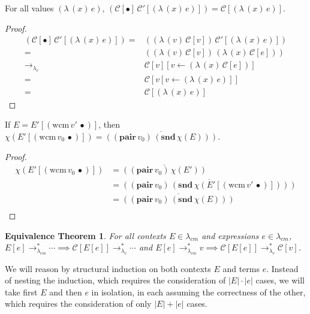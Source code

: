 \documentclass[ms,electronic,twosidetoc,letterpaper,chaptercenter,parttop]{byumsphd}
\newcommand{\pair}[2]{((\mathbf{pair}\,#1)\,#2)}
\newcommand{\eval}[1]{\overline{#1}}
\newcommand{\lvrr}{\rightarrow_{\lambda_v}}
\newcommand{\lvrrs}{\rightarrow_{\lambda_v}^{*}}
\newcommand{\cmrrs}{\rightarrow_{\lambda_{cm}}^{*}}
\newcommand{\C}[1]{\mathcal{C}[#1]}
\newcommand{\Cp}[1]{\mathcal{C}'[#1]}
\newcommand{\abs}[2]{(\lambda\,(#1)\,#2)}
\newcommand{\app}[2]{(#1\,#2)}
\newcommand{\wcm}[2]{(\mathrm{wcm}\,#1\,#2)}
\newcommand{\hole}{\bullet}
\begin{document}
\begin{lemma}
\label{hole-context-to-value}
For all values $\abs{x}{e}$, $\app{\C{\hole}}{\Cp{\abs{x}{e}}}=\C{\abs{x}{e}}$.
\end{lemma}

\begin{proof}
\begin{align*}
\app{\C{\hole}}{\Cp{\abs{x}{e}}} = &\app{\abs{v}{\C{v}}}{\Cp{\abs{x}{e}}}\\
                                 = &\app{\abs{v}{\C{v}}}{\abs{x}{\C{e}}}\\
                             \lvrr &\C{v}[v\leftarrow \abs{x}{\C{e}}]\\
                                 = &\C{v[v\leftarrow \abs{x}{e}]}\\
                                 = &\C{\abs{x}{e}}
\end{align*}
\end{proof}

\begin{lemma}
\label{wcm-collapse}
If $E=E'[\wcm{v'}{\hole}]$, then $\chi(E'[\wcm{v_0}{\hole}])=\eval{\pair{v_0}{\app{\mathbf{snd}}{\chi(E)}}}$.
\end{lemma}

\begin{proof}
\begin{align*}
\chi(E'[\wcm{v_0}{\hole}]) &= \eval{\pair{v_0}{\chi(E')}}\\
                           &= \eval{\pair{v_0}{\app{\mathbf{snd}}{\chi(E'[\wcm{v'}{\hole}])}}}\\
                           &= \eval{\pair{v_0}{\app{\mathbf{snd}}{\chi(E)}}}\\
\end{align*}
\end{proof}

\newtheorem*{eqtheorem}{Equivalence Theorem}
\begin{eqtheorem}
For all contexts $E\in\lambda_{cm}$ and expressions $e\in\lambda_{cm}$, $E[e]\cmrrs\cdots\implies\C{E[e]}\lvrrs\cdots$ and $E[e]\cmrrs v\implies\C{E[e]}\lvrrs \C{v}$.
\end{eqtheorem}

We will reason by structural induction on both contexts $E$ and terms $e$. Instead of nesting the induction, which requires the consideration of $|E|\cdot|e|$ cases, we will take first $E$ and then $e$ in isolation, in each assuming the correctness of the other, which requires the consideration of only $|E|+|e|$ cases. 
\end{document}
